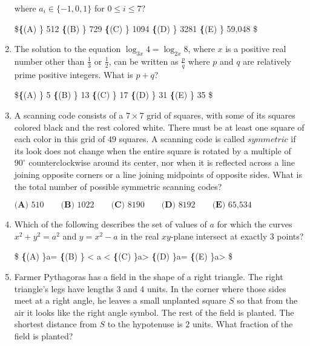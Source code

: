 \documentclass{article}
\begin{document}
\begin{enumerate}[label=\arabic*., itemsep=0.5em]
where $a_i\in \{-1,0,1\}$ for $0\le i \le 7$?

\$\textbf\{(A) \} 512 \qquad 
\textbf\{(B) \} 729 \qquad 
\textbf\{(C) \} 1094 \qquad 
\textbf\{(D) \} 3281 \qquad 
\textbf\{(E) \} 59,048 \$\par \vspace{0.5em}\item The solution to the equation $\log_{3x} 4 = \log_{2x} 8$, where $x$ is a positive real number other than $\frac{1}{3}$ or $\frac{1}{2}$, can be written as $\frac {p}{q}$ where $p$ and $q$ are relatively prime positive integers. What is $p + q$?

\$\textbf\{(A) \} 5   \qquad    
\textbf\{(B) \} 13   \qquad    
\textbf\{(C) \} 17   \qquad   
\textbf\{(D) \} 31 \qquad  
\textbf\{(E) \} 35 \$\par \vspace{0.5em}\item A scanning code consists of a $7 \times 7$ grid of squares, with some of its squares colored black and the rest colored white. There must be at least one square of each color in this grid of $49$ squares. A scanning code is called $\textit{symmetric}$ if its look does not change when the entire square is rotated by a multiple of $90 ^{\circ}$ counterclockwise around its center, nor when it is reflected across a line joining opposite corners or a line joining midpoints of opposite sides. What is the total number of possible symmetric scanning codes?

$\textbf{(A)} \text{ 510} \qquad \textbf{(B)} \text{ 1022} \qquad \textbf{(C)} \text{ 8190} \qquad \textbf{(D)} \text{ 8192} \qquad \textbf{(E)} \text{ 65,534}$\par \vspace{0.5em}\item Which of the following describes the set of values of $a$ for which the curves $x^2+y^2=a^2$ and $y=x^2-a$ in the real $xy$-plane intersect at exactly $3$ points?

\$
\textbf\{(A) \}a= \qquad
\textbf\{(B) \} < a <  \qquad
\textbf\{(C) \}a> \qquad
\textbf\{(D) \}a= \qquad
\textbf\{(E) \}a> \qquad
\$\par \vspace{0.5em}\item Farmer Pythagoras has a field in the shape of a right triangle. The right triangle's legs have lengths $3$ and $4$ units. In the corner where those sides meet at a right angle, he leaves a small unplanted square $S$ so that from the air it looks like the right angle symbol. The rest of the field is planted. The shortest distance from $S$ to the hypotenuse is $2$ units. What fraction of the field is planted?



\end{enumerate}
\end{document}
